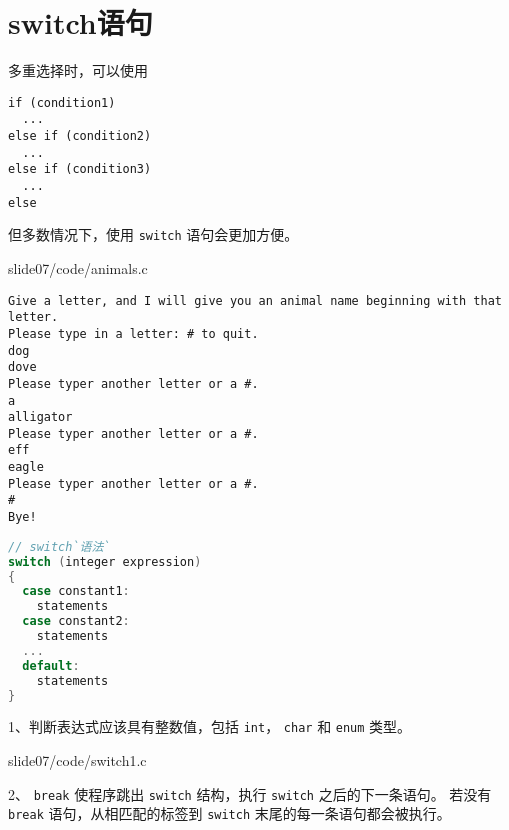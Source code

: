 \section{switch语句}
\begin{frame}[fragile]\ft{\secname}
多重选择时，可以使用
\begin{lstlisting}
if (condition1)
  ...
else if (condition2)
  ...
else if (condition3)
  ...
else    
\end{lstlisting}
但多数情况下，使用 \lstinline|switch| 语句会更加方便。
\end{frame}

\begin{frame}\ft{\secname}

{slide07/code/animals.c}
\end{frame}


\begin{frame}[fragile]\ft{\secname}
\begin{lstlisting}[backgroundcolor=\color{blue!20}]
Give a letter, and I will give you an animal name beginning with that letter.
Please type in a letter: # to quit.
dog
dove
Please typer another letter or a #.
a
alligator
Please typer another letter or a #.
eff
eagle
Please typer another letter or a #.
#
Bye!
\end{lstlisting}
\end{frame}

\begin{frame}[fragile]\ft{\secname}
\begin{lstlisting}[language=c,frame=single]
// switch`语法`
switch (integer expression)
{
  case constant1:
    statements
  case constant2:
    statements
  ...
  default:
    statements
}    
\end{lstlisting}
\end{frame}

\begin{frame}[fragile]\ft{\secname}
  1、判断表达式应该具有整数值，包括 \lstinline|int|， \lstinline|char| 和 \lstinline|enum| 类型。
\end{frame}

\begin{frame}[fragile]\ft{\secname}
  
  {slide07/code/switch1.c}
\end{frame}

\begin{frame}[fragile]\ft{\secname}
2、 \lstinline|break| 使程序跳出 \lstinline|switch| 结构，执行 \lstinline|switch| 之后的下一条语句。 若没有 \lstinline|break| 语句，从相匹配的标签到 \lstinline|switch| 末尾的每一条语句都会被执行。
\end{frame}

